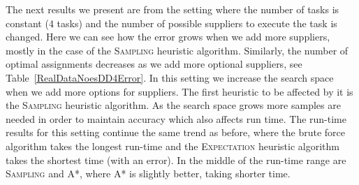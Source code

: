 \documentclass[letterpaper]{article} %
\newcommand{\astar}{\textsc{A*}\xspace}
\newcommand{\sampling}{\textsc{Sampling}\xspace}
\newcommand{\expectation}{\textsc{Expectation}\xspace}
\begin{document}
The next results we present are from the setting where the number of tasks is constant (4 tasks) and the number of possible suppliers to execute the task is changed. Here we can see how the error grows when we add more suppliers, mostly in the case of the \sampling heuristic algorithm. Similarly, the number of optimal assignments decreases as we add more optional suppliers, see Table~\ref{RealDataNoesDD4Error}. In this setting we increase the search space when we add more options for suppliers. The first heuristic to be affected by it is the \sampling heuristic algorithm. As the search space grows more samples are needed in order to maintain accuracy which also affects run time.
The run-time results %
for this setting continue the same trend as before, where the brute force algorithm takes the longest run-time and the \expectation heuristic algorithm takes the shortest time (with an error). In the middle of the run-time range are \sampling and \astar, where \astar is slightly better, taking shorter time.  
\end{document}
